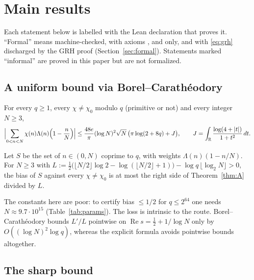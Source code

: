 \section{Main results}\label{sec:results}

Each statement below is labelled with the Lean declaration that proves it. ``Formal'' means machine-checked,
with axioms ,  and  only, and with
\eqref{eq:grh} discharged by the GRH proof (Section~\ref{sec:formal}). Statements marked ``informal'' are
proved in this paper but are not formalized.

\subsection{A uniform bound via Borel--Carath\'eodory}

\begin{theorem}\label{thm:A}
For every $q\ge1$, every $\chi\ne\chi_0$ modulo $q$ (primitive or not) and every integer $N\ge3$,
\[
  \Bigl\lvert\sum_{0<n<N}\chi(n)\Lambda(n)\Bigl(1-\frac nN\Bigr)\Bigr\rvert\le\frac{48e}{\pi}(\log N)^2\sqrt N\,
  \bigl(\pi\log(2+8q)+J\bigr),\qquad J=\int_{\mathbb{R}}\frac{\log(4+\left\lvert t \right\rvert)}{1+t^2}\,dt .
\]
\end{theorem}

\begin{corollary}\label{cor:A}
Let $S$ be the set of $n\in(0,N)$ coprime to $q$, with weights $\Lambda(n)(1-n/N)$. For $N\ge3$ with
$L:=\frac12\bigl(\lfloor N/2\rfloor\log2-\log(\lfloor N/2\rfloor+1)\bigr)-\log q\,\lfloor\log_2N\rfloor>0$, the
bias of $S$ against every $\chi\ne\chi_0$ is at most the right side of Theorem~\ref{thm:A} divided by $L$.
\end{corollary}

The constants here are poor: to certify bias $\le1/2$ for $q\le2^{64}$ one needs $N\approx9.7\cdot10^{15}$
(Table~\ref{tab:params}). The loss is intrinsic to the route. Borel--Carath\'eodory bounds $L'/L$
pointwise on $\operatorname{Re}s=\frac12+1/\log N$ only by $O((\log N)^2\log q)$, whereas the explicit formula
avoids pointwise bounds altogether.

\subsection{The sharp bound}

